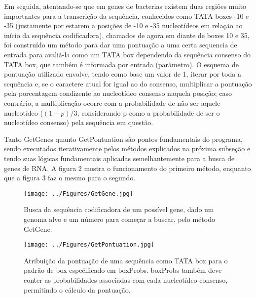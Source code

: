 \documentclass[brazilian,12pt,a4paper,final]{article}
\begin{document}
	\vspace{0.5cm}
	
	Em seguida, atentando-se que em genes de bacterias existem duas regiões muito importantes para a transcrição da sequência, conhecidos como TATA boxes -10 e -35 (justamente por estarem a posições de -10 e -35 nucleotídeos em relação ao início da sequência codificadora), chamados de agora em diante de boxes 10 e 35, foi construído um método para dar uma pontuação a uma certa sequencia de entrada
	para avaliá-la como um TATA box dependendo da sequência consenso do TATA box, que também é informada por entrada (parâmetro). O esquema de pontuação utilizado envolve, tendo como base um valor de 1, iterar por toda a sequência e, se o caractere atual for igual ao do consenso, multiplicar a pontuação pela porcentagem condizente ao nucleotídeo consenso naquela posição; caso contrário, a multiplicação ocorre com a probabilidade de não ser aquele nucleotídeo (\((1-p)/3\), considerando p como a probabilidade de ser o nucleotídeo consenso)	pela sequência em questão.
	
	\vspace{0.5cm}
	
	Tanto GetGenes quanto GetPontuation são pontos fundamentais do programa, sendo executados iterativamente pelos métodos explicados na próxima subseção e tendo suas lógicas fundamentais aplicadas semelhantemente para a busca de genes de RNA. A figura 2 mostra o funcionamento do primeiro método, enquanto que a figura 3 faz o mesmo para o segundo.
	
	\begin{figure}[hbtp]
		\begin{center}
			\texttt{[image: ../Figures/GetGene.jpg]}
			\caption{Busca da sequência codificadora de um possível gene, dado um genoma alvo e um número para começar a buscar, pelo método GetGene.}
			\label{fig}
		\end{center}
	\end{figure}
	
	\begin{figure}[hbtp]
		\begin{center}
			\texttt{[image: ../Figures/GetPontuation.jpg]}
			\caption{Atribuição da pontuação de uma sequência como TATA box para o padrão de box espećificado em boxProbs. boxProbs também deve conter as probabilidades associadas com cada nucleotídeo consenso, permitindo o cálculo da pontuação.}
			\label{fig}
		\end{center}
	\end{figure}
	
\end{document}

